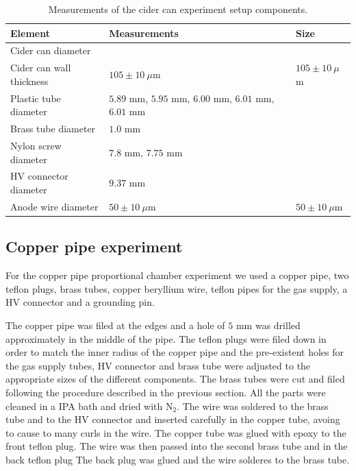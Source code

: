 \begin{table}[htb]
	\begin{tabularx}{\linewidth}{X|X|p{2cm}}
			\textbf{Element}         & \textbf{Measurements}                                 & \textbf{Size}       \\ \hline
			Cider can diameter       &                                                       &                     \\
			Cider can wall thickness & $105 \pm 10 \ \mu$m                                   & $105 \pm 10 \ \mu$m \\
			Plastic tube diameter    & $5.89$ mm, $5.95$ mm, $6.00$ mm, $6.01$ mm, $6.01$ mm &                     \\
			Brass tube diameter      & $1.0$ mm                                              &                     \\
			Nylon screw diameter     & $7.8$ mm, $7.75$ mm                                   &                     \\
			HV connector diameter    & $9.37$ mm                                             &                     \\
			Anode wire diameter      & $50 \pm 10 \ \mu$m                                    & $50 \pm 10 \ \mu$m 
	\end{tabularx}
\caption{Measurements of the cider can experiment setup components.}
\label{Tab:cidercan_sizes}
\end{table}



\subsection{Copper pipe experiment}
For the copper pipe proportional chamber experiment we used a copper pipe, two
teflon plugs, brass tubes, copper beryllium wire, teflon pipes for the gas
supply, a HV connector and a grounding pin.

The copper pipe was filed at the edges and a hole of $5$ mm was drilled
approximately in the middle of the pipe. The teflon plugs were filed down in
order to match the inner radius of the copper pipe and the pre-existent holes
for the gas supply tubes, HV connector and brass tube were adjusted to the
appropriate sizes of the different components. The brass tubes were cut and
filed following the procedure described in the previous section. All the parts
were cleaned in a IPA bath and dried with N$_2$. The wire was soldered to the
brass tube and to the HV connector and inserted carefully in the copper tube,
avoing to cause to many curls in the wire. The copper tube was glued with epoxy
to the front teflon plug. The wire was then passed into the second brass tube
and in the back teflon plug  The back plug was glued and the wire solderes to
the brass tube.


